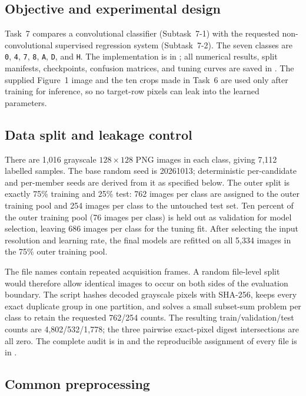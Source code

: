 \subsection{Objective and experimental design}

Task~7 compares a convolutional classifier (Subtask~7-1) with the requested
non-convolutional supervised regression system (Subtask~7-2).  The seven
classes are \texttt{0}, \texttt{4}, \texttt{7}, \texttt{8}, \texttt{A},
\texttt{D}, and \texttt{H}.  The implementation is in
; all numerical results, split manifests, checkpoints,
confusion matrices, and tuning curves are saved in
.  The supplied Figure~1 image and the ten crops made in
Task~6 are used only after training for inference, so no target-row pixels can
leak into the learned parameters.

\subsection{Data split and leakage control}

There are 1,016 grayscale $128\times128$ PNG images in each class, giving
7,112 labelled samples.  The base random seed is 20261013; deterministic per-candidate and per-member
seeds are derived from it as specified below.  The
outer split is exactly 75\% training and 25\% test: 762 images per class are
assigned to the outer training pool and 254 images per class to the untouched
test set.  Ten percent of the outer training pool (76 images per class) is
held out as validation for model selection, leaving 686 images per class for
the tuning fit.  After selecting the input resolution and learning rate, the
final models are refitted on all 5,334 images in the 75\% outer training pool.

The file names contain repeated acquisition frames.  A random file-level
split would therefore allow identical images to occur on both sides of the
evaluation boundary.  The script hashes decoded grayscale pixels with
SHA-256, keeps every exact duplicate group in one partition, and solves a
small subset-sum problem per class to retain the requested 762/254 counts.
The resulting train/validation/test counts are 4,802/532/1,778; the three
pairwise exact-pixel digest intersections are all zero.  The complete audit is
in  and the reproducible assignment of
every file is in .

\subsection{Common preprocessing}

